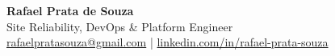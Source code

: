 \begin{center}
    \huge \textbf{Rafael Prata de Souza} \\[4pt]
    \normalsize
    Site Reliability, DevOps \& Platform Engineer \\[3pt]
    \href{mailto:rafaelpratasouza@gmail.com}{rafaelpratasouza@gmail.com} |
    \href{https://www.linkedin.com/in/rafael-prata-souza}{linkedin.com/in/rafael-prata-souza}
\end{center}

